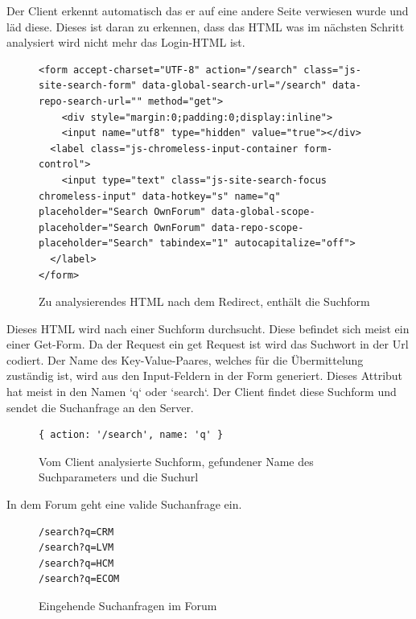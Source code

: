 Der Client erkennt automatisch das er auf eine andere Seite verwiesen wurde und läd diese. Dieses ist daran zu erkennen, dass das HTML was im nächsten Schritt analysiert wird nicht mehr das Login-HTML ist.

\begin{figure}[h!]
\begin{lstlisting}[language=HTML5]
<form accept-charset="UTF-8" action="/search" class="js-site-search-form" data-global-search-url="/search" data-repo-search-url="" method="get">
	<div style="margin:0;padding:0;display:inline">
	<input name="utf8" type="hidden" value="true"></div>
  <label class="js-chromeless-input-container form-control">
    <input type="text" class="js-site-search-focus  chromeless-input" data-hotkey="s" name="q" placeholder="Search OwnForum" data-global-scope-placeholder="Search OwnForum" data-repo-scope-placeholder="Search" tabindex="1" autocapitalize="off">
  </label>
</form>
\end{lstlisting}
\caption{Zu analysierendes HTML nach dem Redirect, enthält die Suchform}
\end{figure}

Dieses HTML wird nach einer Suchform durchsucht. Diese befindet sich meist ein einer Get-Form. Da der Request ein get Request ist wird das Suchwort in der Url codiert. Der Name des Key-Value-Paares, welches für die Übermittelung zuständig ist, wird aus den Input-Feldern in der Form generiert. Dieses Attribut hat meist in den Namen `q` oder `search`. Der Client findet diese Suchform und sendet die Suchanfrage an den Server.

\newpage

\begin{figure}[ht]
\begin{lstlisting}[language=HTML5]
{ action: '/search', name: 'q' }
\end{lstlisting}
\caption{Vom Client analysierte Suchform, gefundener Name des Suchparameters und die Suchurl}
\end{figure}

In dem Forum geht eine valide Suchanfrage ein.


\begin{figure}[ht]
\begin{lstlisting}[language=HTML5]
/search?q=CRM
/search?q=LVM
/search?q=HCM
/search?q=ECOM
\end{lstlisting}
\caption{Eingehende Suchanfragen im Forum }
\end{figure}

